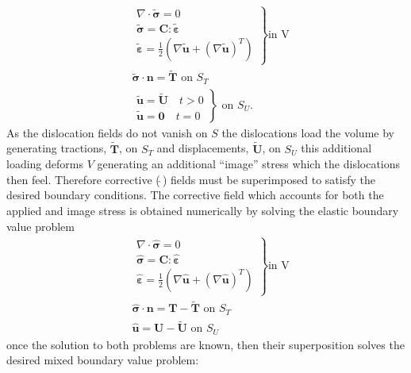 \documentclass[11pt]{iopart}
\begin{document}
%
\begin{align}
     & \left.
    \begin{array}{l}
        \nabla\cdot{\bm{\tilde{\sigma}}} = 0                  \\
        \bm{\tilde{\sigma}} = \bm{C}:\tilde{\bm{\varepsilon}} \\
        \tilde{\bm{\varepsilon}}=\frac{1}{2}\left(\nabla\tilde{\bm{u}}+(\nabla\tilde{\bm{u}})^T\right)
    \end{array}
    \right\}\textrm{in V}                                                \\
     & \tilde{\bm{\sigma}}\cdot\bm{n} = \tilde{\bm{T}} \textrm{ on } S_T \\
     & \left.
    \begin{array}{l}
        \tilde{\bm{u}} = \tilde{\bm{U}} \quad t>0 \\
        \tilde{\bm{u}} = \bm{0} \quad t=0
        \label{eq:utildebc}
    \end{array}
    \right\} \textrm{ on } S_U.
\end{align}
%
As the dislocation fields do not vanish on $S$ the dislocations load the volume by generating tractions, $\tilde{\bm{T}}$, on $S_T$ and displacements, $\tilde{\bm{U}}$, on $S_U$ this additional loading deforms $V$ generating an additional ``image'' stress which the dislocations then feel. Therefore corrective ($\hat{~}$) fields must be superimposed to satisfy the desired boundary conditions. The corrective field which accounts for both the applied and image stress is obtained numerically by solving the elastic boundary value problem
%
\begin{align}
     & \left.
    \begin{array}{l}
        \nabla\cdot{\bm{\hat{\sigma}}} = 0                \\
        \bm{\hat{\sigma}} = \bm{C}:\hat{\bm{\varepsilon}} \\
        \hat{\bm{\varepsilon}}=\frac{1}{2}\left(\nabla\hat{\bm{u}}+(\nabla\hat{\bm{u}})^{T}\right)
    \end{array}
    \right\}\textrm{in V}                                                                        \\
     & \hat{\bm{\sigma}}\cdot\bm{n} = \bm{T} - \tilde{\bm{T}} \textrm{ on } S_T\label{eq:thatbc} \\
     & \hat{\bm{u}} = \bm{U} - \tilde{\bm{U}} \textrm{ on } S_U \label{eq:uhatbc}
\end{align}
%
once the solution to both problems are known, then their superposition solves the desired mixed boundary value problem:
\end{document}
